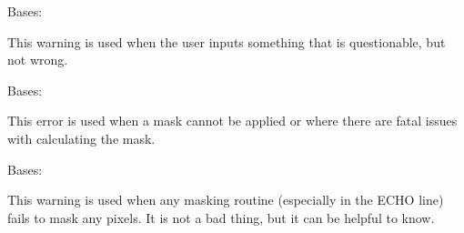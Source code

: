 \documentclass[letterpaper,10pt,english]{sphinxmanual}
\begin{document}

\begin{fulllineitems}
\label{\detokenize{python_docstrings/IfA_Smeargle.meta.errors:IfA_Smeargle.meta.errors.InputWarning}}
Bases: {\hyperref[\detokenize{python_docstrings/IfA_Smeargle.meta.errors:IfA_Smeargle.meta.errors.Smeargle_Warning}]{}}

This warning is used when the user inputs something that is questionable,
but not wrong.

\end{fulllineitems}


\begin{fulllineitems}
\label{\detokenize{python_docstrings/IfA_Smeargle.meta.errors:IfA_Smeargle.meta.errors.MaskingError}}
Bases: {\hyperref[\detokenize{python_docstrings/IfA_Smeargle.meta.errors:IfA_Smeargle.meta.errors.Smeargle_Exception}]{}}

This error is used when a mask cannot be applied or where there are
fatal issues with calculating the mask.

\end{fulllineitems}


\begin{fulllineitems}
\label{\detokenize{python_docstrings/IfA_Smeargle.meta.errors:IfA_Smeargle.meta.errors.MaskingWarning}}
Bases: {\hyperref[\detokenize{python_docstrings/IfA_Smeargle.meta.errors:IfA_Smeargle.meta.errors.Smeargle_Warning}]{}}

This warning is used when any masking routine (especially in the ECHO
line) fails to mask any pixels. It is not a bad thing, but it can be
helpful to know.

\end{fulllineitems}
\end{document}
